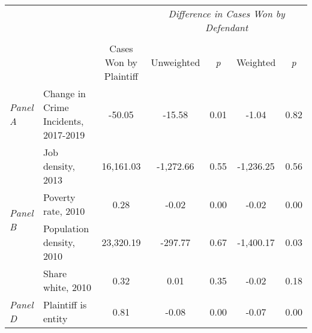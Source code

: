 \begin{tabular}{llccccc}
\toprule
 &  & \textit{} & \multicolumn{4}{c}{\textit{Difference in Cases Won by Defendant}} \\
\cline{4-7}
\\
 &  & Cases Won by Plaintiff & Unweighted & \emph{p} & Weighted & \emph{p} \\
\midrule
\textit{Panel A} & Change in Crime Incidents, 2017-2019 & -50.05 & -15.58 & 0.01 & -1.04 & 0.82 \\
\cline{1-7}
\multirow[c]{4}{.75cm}{\textit{Panel B}} & Job density, 2013 & 16,161.03 & -1,272.66 & 0.55 & -1,236.25 & 0.56 \\
 & Poverty rate, 2010 & 0.28 & -0.02 & 0.00 & -0.02 & 0.00 \\
 & Population density, 2010 & 23,320.19 & -297.77 & 0.67 & -1,400.17 & 0.03 \\
 & Share white, 2010 & 0.32 & 0.01 & 0.35 & -0.02 & 0.18 \\
\cline{1-7}
\textit{Panel D} & Plaintiff is entity & 0.81 & -0.08 & 0.00 & -0.07 & 0.00 \\
\cline{1-7}
\bottomrule
\end{tabular}
